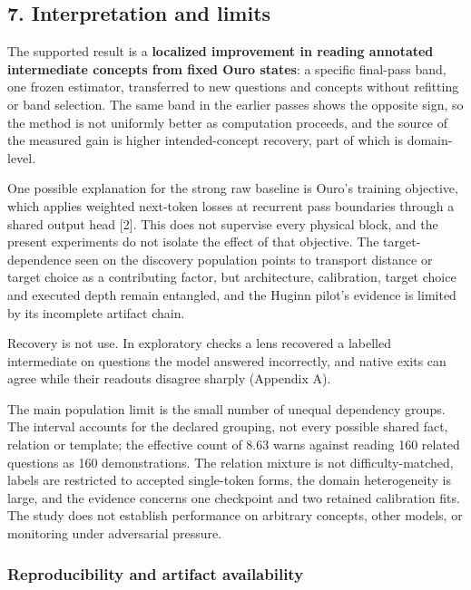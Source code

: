 \documentclass[
  british,
  11pt,
  a4paper,
]{article}
\begin{document}
\subsection{7. Interpretation and
limits}\label{interpretation-and-limits}

The supported result is a \textbf{localized improvement in reading
annotated intermediate concepts from fixed Ouro states}: a specific
final-pass band, one frozen estimator, transferred to new questions and
concepts without refitting or band selection. The same band in the
earlier passes shows the opposite sign, so the method is not uniformly
better as computation proceeds, and the source of the measured gain is
higher intended-concept recovery, part of which is domain-level.

One possible explanation for the strong raw baseline is Ouro's training
objective, which applies weighted next-token losses at recurrent pass
boundaries through a shared output head {[}2{]}. This does not supervise
every physical block, and the present experiments do not isolate the
effect of that objective. The target-dependence seen on the discovery
population points to transport distance or target choice as a
contributing factor, but architecture, calibration, target choice and
executed depth remain entangled, and the Huginn pilot's evidence is
limited by its incomplete artifact chain.

Recovery is not use. In exploratory checks a lens recovered a labelled
intermediate on questions the model answered incorrectly, and native
exits can agree while their readouts disagree sharply (Appendix A).

The main population limit is the small number of unequal dependency
groups. The interval accounts for the declared grouping, not every
possible shared fact, relation or template; the effective count of 8.63
warns against reading 160 related questions as 160 demonstrations. The
relation mixture is not difficulty-matched, labels are restricted to
accepted single-token forms, the domain heterogeneity is large, and the
evidence concerns one checkpoint and two retained calibration fits. The
study does not establish performance on arbitrary concepts, other
models, or monitoring under adversarial pressure.

\subsubsection{Reproducibility and artifact
availability}\label{reproducibility-and-artifact-availability}
\end{document}
